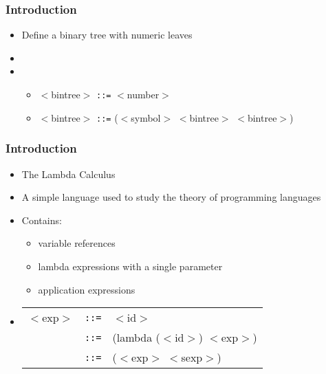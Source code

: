 \documentclass{beamer}
\newcommand{\is}{\texttt{::=}}
\begin{document}
\begin{frame}[fragile]
\frametitle{Introduction}
\begin{scriptsize}
\begin{itemize}
\item<1-> Define a binary tree with numeric leaves
\item<1->

\item<2->
\begin{itemize}
    \item $<$bintree$>$ \is{} $<$number$>$ \newline
    \item $<$bintree$>$ \is{} ($<$symbol$>$ $<$bintree$>$ $<$bintree$>$)
\end{itemize}
\end{itemize}
\end{scriptsize}
\end{frame}

\begin{frame}[fragile]
\frametitle{Introduction}
\begin{scriptsize}
\begin{itemize}
\item<1-> The Lambda Calculus

\item<1-> A simple language used to study the theory of programming languages

\item<1-> Contains:
  \begin{itemize}
    \item variable references
    \item lambda expressions with a single parameter
    \item application expressions
  \end{itemize}

\item<2->
  \begin{tabular}{lll}
    $<$exp$>$ & \is{} & $<$id$>$ \\
     & \is{} & (lambda ($<$id$>$) $<$exp$>$) \\
     & \is{} & ($<$exp$>$ $<$sexp$>$) \\
  \end{tabular}

\end{itemize}
\end{scriptsize}
\end{frame}
\end{document}
